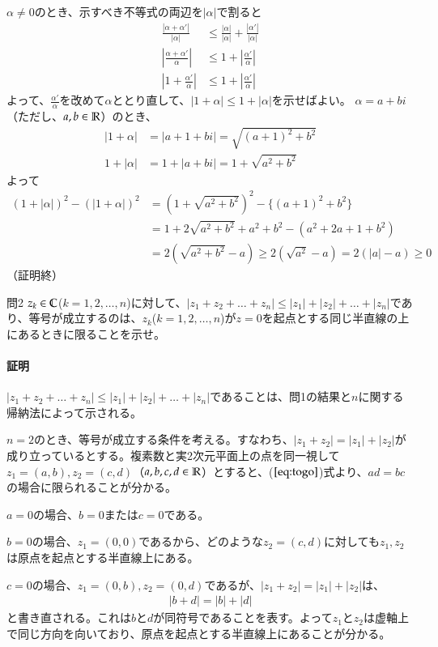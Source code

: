 $\alpha\neq 0$のとき、示すべき不等式の両辺を$|\alpha|$で割ると
\begin{align*}
    \frac{|\alpha+\alpha'|}{|\alpha|}&\le\frac{|\alpha|}{|\alpha|}+\frac{|\alpha'|}{|\alpha|}\\
    \left|\frac{\alpha+\alpha'}{\alpha}\right|&\le 1+\left|\frac{\alpha'}{\alpha}\right|\\
    \left|1+\frac{\alpha'}{\alpha}\right|&\le 1+\left|\frac{\alpha'}{\alpha}\right|
\end{align*}
よって、$\frac{\alpha'}{\alpha}$を改めて$\alpha$ととり直して、$|1+\alpha|\le 1+|\alpha|$を示せばよい。
$\alpha=a+bi$（ただし、$a,b\in\mathbb{R}$）のとき、
\begin{align*}
    |1+\alpha|&=|a+1+bi|=\sqrt{(a+1)^2+b^2}\\
    1+|\alpha|&=1+|a+bi|=1+\sqrt{a^2+b^2}
\end{align*}
よって
\begin{align*}
    (1+|\alpha|)^2-(|1+\alpha|)^2
    &=(1+\sqrt{a^2+b^2})^2-\{(a+1)^2+b^2\}\\
    &=1+2\sqrt{a^2+b^2}+a^2+b^2-(a^2+2a+1+b^2)\\
    &=2(\sqrt{a^2+b^2}-a)\ge 2(\sqrt{a^2}-a)
    =2(|a|-a)\ge 0
\end{align*}
（証明終）
\begin{mysimplebox}{問2}
    $z_k\in\mathbb{C}$($k=1,2,\dots,n$)に対して、$|z_1+z_2+\dots+z_n|\le|z_1|+|z_2|+\dots+|z_n|$であり、等号が成立するのは、$z_k$($k=1,2,\dots,n$)が$z=0$を起点とする同じ半直線の上にあるときに限ることを示せ。
\end{mysimplebox}
\paragraph{証明}
$|z_1+z_2+\dots+z_n|\le|z_1|+|z_2|+\dots+|z_n|$であることは、問1の結果と$n$に関する帰納法によって示される。

$n=2$のとき、等号が成立する条件を考える。すなわち、$|z_1+z_2|=|z_1|+|z_2|$が成り立っているとする。複素数と実2次元平面上の点を同一視して$z_1=(a,b), z_2=(c,d)$（$a,b,c,d\in\mathbb{R}$）とすると、($\ref{eq:togo}$)式より、$ad=bc$の場合に限られることが分かる。

$a=0$の場合、$b=0$または$c=0$である。

$b=0$の場合、$z_1=(0,0)$であるから、どのような$z_2=(c,d)$に対しても$z_1, z_2$は原点を起点とする半直線上にある。

$c=0$の場合、$z_1=(0,b), z_2=(0,d)$であるが、$|z_1+z_2|=|z_1|+|z_2|$は、
\begin{align*}
    |b+d|=|b|+|d|
\end{align*}
と書き直される。これは$b$と$d$が同符号であることを表す。よって$z_1$と$z_2$は虚軸上で同じ方向を向いており、原点を起点とする半直線上にあることが分かる。

